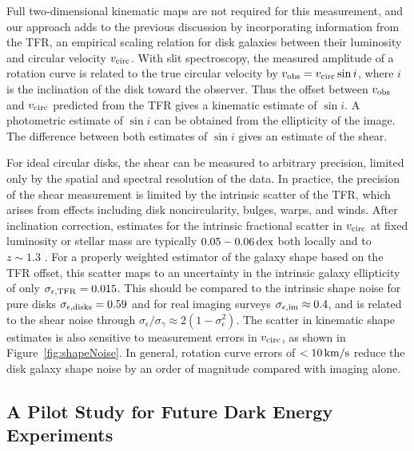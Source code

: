 \documentclass[12pt]{article}
\begin{document}
Full two-dimensional kinematic maps are not required for this measurement, and our approach adds to the previous discussion by incorporating information from the TFR, an empirical scaling relation for disk galaxies between their luminosity and circular velocity $v_{\rm circ}$. With slit spectroscopy, the measured amplitude of a rotation curve is related to the true circular velocity by $v_{\rm obs} = v_{\rm circ} \sin i$, where $i$ is the inclination of the disk toward the observer. Thus the offset between $v_{\rm obs}$ and $v_{\rm circ}$ predicted from the TFR gives a kinematic estimate of $\sin i$. A photometric estimate of $\sin i$ can be obtained from the ellipticity of the image. The difference between both estimates of $\sin i$ gives an estimate of the shear.

For ideal circular disks, the shear can be measured to arbitrary precision, limited only by the spatial and spectral resolution of the data. In practice, the precision of the shear measurement is limited by the intrinsic scatter of the TFR, which arises from effects including disk noncircularity, bulges, warps, and winds. After inclination correction, estimates for the intrinsic fractional scatter in $v_{\rm circ}$ at fixed luminosity or stellar mass are typically $0.05-0.06\,{\rm dex}$ both locally and to $z\sim1.3$ \citep{Reyes2011, Miller2011}. For a properly weighted estimator of the galaxy shape based on the TFR offset, this scatter maps to an uncertainty in the intrinsic galaxy ellipticity of only $\sigma_{\epsilon, {\rm TFR}}=0.015$. This should be compared to the intrinsic shape noise for pure disks $\sigma_{\epsilon, {\rm disks}}=0.59$ and for real imaging surveys $\sigma_{\epsilon, {\rm im}}\approx0.4$, and is related to the shear noise through $\sigma_\epsilon / \sigma_\gamma \approx 2(1-\sigma_\epsilon^2)$\citep{Bernstein2002, Hirata2004}. The scatter in kinematic shape estimates is also sensitive to measurement errors in $v_{\rm circ}$, as shown in Figure~\ref{fig:shapeNoise}. In general, rotation curve errors of $<10\,{\rm km/s}$ reduce the disk galaxy shape noise by an order of magnitude compared with imaging alone.

\subsection{A Pilot Study for Future Dark Energy Experiments}
\end{document}
